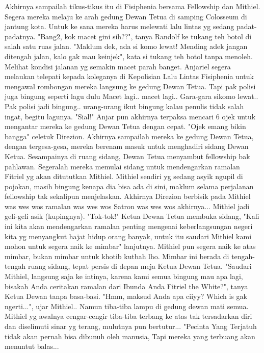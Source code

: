 \documentclass[a4paper,11pt,final]{article}
\begin{document}
Akhirnya sampailah tikus-tikus itu di Fisiphenia bersama Fellowship dan Mithiel.
Segera mereka melaju ke arah gedung Dewan Tetua di samping Colosseum di jantung kota. Untuk ke sana mereka harus melewati lalu lintas yg sedang padat-padatnya.
"Bang2, kok macet gini sih??", tanya Randolf ke tukang teh botol di salah satu ruas jalan. "Maklum dek, ada si komo lewat! Mending adek jangan ditengah jalan, kalo gak mau keinjek", kata si tukang teh botol tanpa menoleh.
Melihat kondisi jalanan yg semakin macet parah banget. Anjariel segera melaukan telepati kepada koleganya di Kepolisian Lalu Lintas Fisiphenia untuk mengawal rombongan mereka langsung ke gedung Dewan Tetua.
Tapi pak polisi juga bingung seperti lagu dulu Macet lagi.. macet lagi.. Gara-gara sikomo lewat.. Pak polisi jadi bingung.. urang-urang ikut bingung kalau penulis tidak salah ingat, begitu lagunya.
"Sial!" Anjar pun akhirnya terpaksa mencari 6 ojek untuk mengantar mereka ke gedung Dewan Tetua dengan cepat. "Ojek emang bikin bangga" celetuk Direzion.
Akhirnya sampailah mereka ke gedung Dewan Tetua, dengan tergesa-gesa, mereka berenam masuk untuk menghadiri sidang Dewan Ketua.
Sesampainya di ruang sidang, Dewan Tetua menyambut fellowship bak pahlawan.
Segeralah mereka memulai sidang untuk mendengarkan ramalan Fitriel yg akan ditututkan Mithiel. Mithiel sendiri yg sedang asyik ngupil di pojokan, masih bingung kenapa dia bisa ada di sini, maklum selama perjalanan fellowship tak sekalipun menjelaskan.
Akhirnya Direzion berbisik pada Mithiel was wes wos ramalan was wes wos Satron was wes wos akhirnya... Mithiel jadi geli-geli asik (kupingnya).
"Tok-tok!" Ketua Dewan Tetua membuka sidang, "Kali ini kita akan mendengarkan ramalan penting mengenai keberlangsungan negeri kita yg menyangkut hajat hidup orang banyak, untuk itu saudari Mithiel kami mohon untuk segera naik ke mimbar" lanjutnya.
Mithiel pun segera naik ke atas mimbar, bukan mimbar untuk khotib kutbah lho. Mimbar ini berada di tengah-tengah ruang sidang, tepat persis di depan meja Ketua Dewan Tetua.
"Saudari Mithiel, langsung saja ke intinya, karena kami semua bingung mau apa lagi, bisakah Anda ceritakan ramalan dari Ibunda Anda Fitriel the White?", tanya Ketua Dewan tanpa basa-basi.
"Hmm, maksud Anda apa ciiyy? Which is gak ngerti...", ujar Mithiel..
Namun tiba-tiba lampu di gedung dewan mati semua. Mithiel yg awalnya cengar-cengir tiba-tiba terbang ke atas tak tersadarkan diri dan diselimuti sinar yg terang, mulutnya pun bertutur...
"Pecinta Yang Terjatuh tidak akan pernah bisa dibunuh oleh manusia, Tapi mereka yang terbuang akan menuntut balas...
\end{document}
